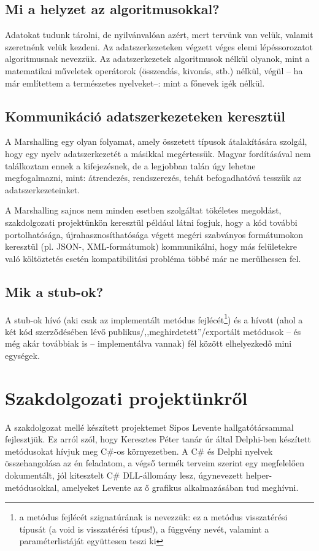 \documentclass[tocnopagenum]{thesis-ekf}
\theoremstyle{definition}
\theoremstyle{remark}
\begin{document}
	\section{Mi a helyzet az algoritmusokkal?}
	Adatokat tudunk tárolni, de nyilvánvalóan azért, mert tervünk van velük, valamit szeretnénk velük kezdeni. Az adatszerkezeteken végzett véges elemi lépéssorozatot algoritmusnak nevezzük. Az adatszerkezetek algoritmusok nélkül olyanok, mint a matematikai műveletek operátorok (összeadás, kivonás, stb.) nélkül, végül -- ha már említettem a természetes nyelveket--: mint a főnevek igék nélkül.
	\section{Kommunikáció adatszerkezeteken keresztül}
	A Marshalling egy olyan folyamat, amely összetett típusok átalakítására szolgál, hogy egy nyelv adatszerkezetét a másikkal megértessük. Magyar fordításával nem találkoztam ennek a kifejezésnek, de a legjobban talán úgy lehetne megfogalmazni, mint: átrendezés, rendszerezés, tehát befogadhatóvá tesszük az adatszerkezeteinket.
	\par
	A Marshalling sajnos nem minden esetben szolgáltat tökéletes megoldást, szakdolgozati projektünkön keresztül például látni fogjuk, hogy a kód további portolhatósága, újrahasznosíthatósága végett megéri szabványos formátumokon keresztül (pl. JSON-, XML-formátumok) kommunikálni, hogy más felületekre való költöztetés esetén kompatibilitási probléma többé már ne merülhessen fel.
	\section{Mik a stub-ok?}
	A stub-ok hívó (aki csak az implementált metódus fejlécét\footnote{a metódus fejlécét szignatúrának is nevezzük: ez a metódus visszatérési típusát (a void is visszatérési típus!), a függvény nevét, valamint a paraméterlistáját együttesen teszi ki}) és a hívott (ahol a két kód szerződésében lévő publikus/,,meghirdetett''/exportált metódusok -- és még akár továbbiak is -- implementálva vannak) fél között elhelyezkedő mini egységek.
	
	\chapter{Szakdolgozati projektünkről}
	A szakdolgozat mellé készített projektemet Sipos Levente hallgatótársammal fejlesztjük. Ez arról szól, hogy Keresztes Péter tanár úr által Delphi-ben készített metódusokat hívjuk meg C\#-os környezetben. A C\# és Delphi nyelvek összehangolása az én feladatom, a végső termék terveim szerint egy megfelelően dokumentált, jól kitesztelt C\# DLL-állomány lesz, úgynevezett helper-metódusokkal, amelyeket Levente az ő grafikus alkalmazásában tud meghívni.
\end{document}

